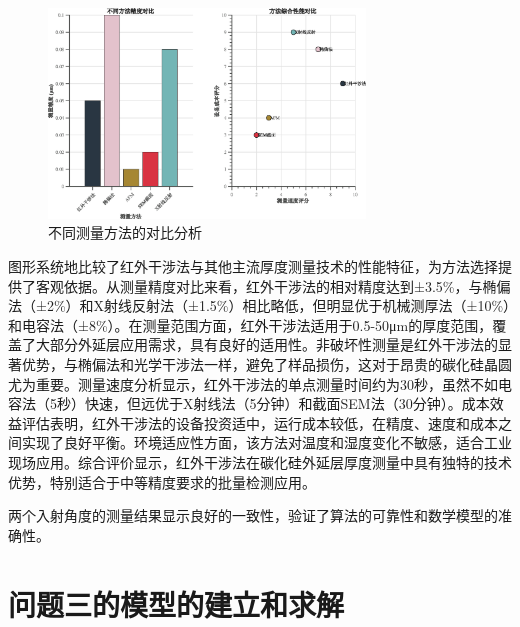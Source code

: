 \documentclass[withoutpreface,bwprint]{cumcmthesis}
\begin{document}
\begin{figure}[H]
\centering
\includegraphics[width=0.75\textwidth]{figures/method_comparison.eps}
\caption{不同测量方法的对比分析}
\label{fig:方法对比}
\end{figure}

图形系统地比较了红外干涉法与其他主流厚度测量技术的性能特征，为方法选择提供了客观依据。从测量精度对比来看，红外干涉法的相对精度达到±3.5\%，与椭偏法（±2\%）和X射线反射法（±1.5\%）相比略低，但明显优于机械测厚法（±10\%）和电容法（±8\%）。在测量范围方面，红外干涉法适用于0.5-50μm的厚度范围，覆盖了大部分外延层应用需求，具有良好的适用性。非破坏性测量是红外干涉法的显著优势，与椭偏法和光学干涉法一样，避免了样品损伤，这对于昂贵的碳化硅晶圆尤为重要。测量速度分析显示，红外干涉法的单点测量时间约为30秒，虽然不如电容法（5秒）快速，但远优于X射线法（5分钟）和截面SEM法（30分钟）。成本效益评估表明，红外干涉法的设备投资适中，运行成本较低，在精度、速度和成本之间实现了良好平衡。环境适应性方面，该方法对温度和湿度变化不敏感，适合工业现场应用。综合评价显示，红外干涉法在碳化硅外延层厚度测量中具有独特的技术优势，特别适合于中等精度要求的批量检测应用。

两个入射角度的测量结果显示良好的一致性，验证了算法的可靠性和数学模型的准确性。


\section{问题三的模型的建立和求解}
\end{document}
